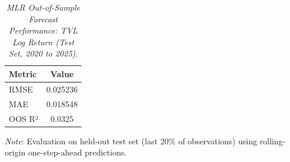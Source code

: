\begin{table}[h]
  \centering
  \caption{\textit{MLR Out-of-Sample Forecast Performance: TVL Log Return (Test Set, 2020 to 2025)}.}
  \label{tab:mlroos20202025}
  \begin{tabular}{lc}
    \toprule
    \textbf{Metric} & \textbf{Value} \\ 
    \midrule
    RMSE & 0.025236 \\ 
    MAE & 0.018548 \\ 
    OOS R² & 0.0325 \\ 
    \bottomrule
  \end{tabular}
  \vspace{2pt}
  \footnotesize{\textit{Note}: Evaluation on held-out test set (last 20\% of observations) using rolling-origin one-step-ahead predictions.}\\
\end{table}